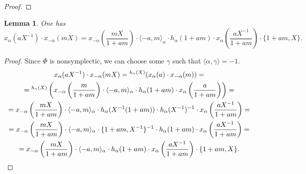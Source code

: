 \documentclass[oneside, 8pt]{amsart}
\newtheorem{lemma}{Lemma}
\theoremstyle{remark}
\theoremstyle{definition}
\numberwithin{equation}{section}
\begin{document}
\begin{proof}
\begin{comment}
It remains to verify the assertion for the remaining generator $z_\alpha(f, X\xi)$ of type 2.
Again choose $\beta$ to be any root such that $\alpha+\beta \in \Phi$.
Substituting in~\eqref{Z5} of~\cref{Zrels} $s = -\epsilon f$, $\xi = -\epsilon \xi$, $\eta=X$ and expressing $z_\alpha(f, X\xi)$ through other terms we obtain that
\begin{multline} \nonumber z_\alpha(f, X\xi) = x_{\alpha+\beta}(\epsilon Xf) \cdot x_{\beta}(-X^2 f \xi) \cdot x_{-\beta}(f \xi) \cdot x_\alpha(f) \cdot \\ 
 \cdot z_{\alpha+\beta}(-\epsilon X f, -\epsilon \xi) \cdot z_{-\beta}(-f\xi, -X) \cdot x_{-\alpha-\beta}(-\epsilon X f \xi^2) \cdot x_{-\alpha}(-X^2 f\xi^2), \end{multline}
where $\epsilon = N_{\alpha,\beta}$.  
The factors in the right-hand side are generators of type 1, 1, 2, 2, 1, 2, 1, 4. 
It is clear, that conjugation by $x_{\alpha}(aX^{-1})$ acts trivially on the fourth factor $x_\alpha(f)$, 
while for the other factors we have already verified that their conjugates belong to $P_{\alpha}(0)$. 
\end{comment}
\end{proof}

\begin{lemma} \label{lem:Tulenbayev-formula} One has
 \[x_\alpha(aX^{-1}) \cdot x_{-\alpha}(mX) = x_{-\alpha}\left(\frac{mX}{1+am}\right) \cdot \langle -a, m\rangle_\alpha \cdot h_\alpha(1+am) \cdot 
 x_{\alpha}\left(\frac{aX^{-1}}{1+am}\right) \cdot \{1+am, X\}.\] \end{lemma}
\begin{proof} Since $\Phi$ is nonsymplectic, we can choose some $\gamma$ such that $\langle \alpha, \gamma \rangle = -1$.
 \begin{multline*}
 x_\alpha(aX^{-1}) \cdot x_{-\alpha}(mX) %
 = {}^{h_\gamma(X)}(x_\alpha(a) \cdot x_{-\alpha}(m)) = \\
 = {}^{h_\gamma(X)}\left( x_{-\alpha}\left(\frac{m}{1+am}\right) \cdot \langle -a, m\rangle_\alpha \cdot h_\alpha(1+am) \cdot x_\alpha\left(\frac{a}{1+am}\right) \right) = \\
 = x_{-\alpha}\left(\frac{mX}{1+am}\right) \cdot \langle -a, m\rangle_\alpha \cdot h_\alpha(X^{-1}(1+am))\cdot h_\alpha(X^{-1})^{-1} \cdot x_{\alpha}\left(\frac{aX^{-1}}{1+am}\right) = \\
 = x_{-\alpha}\left(\frac{mX}{1+am}\right) \cdot \langle -a, m\rangle_\alpha \cdot \{1+am, X^{-1}\}^{-1} \cdot h_\alpha(1+am)\cdot x_{\alpha}\left(\frac{aX^{-1}}{1+am}\right) = \\
 = x_{-\alpha}\left(\frac{mX}{1+am}\right) \cdot \langle -a, m\rangle_\alpha \cdot h_\alpha(1+am) \cdot x_{\alpha}\left(\frac{aX^{-1}}{1+am}\right) \cdot \{1+am, X\}. \qedhere
\end{multline*}
\end{proof}
\end{document}
